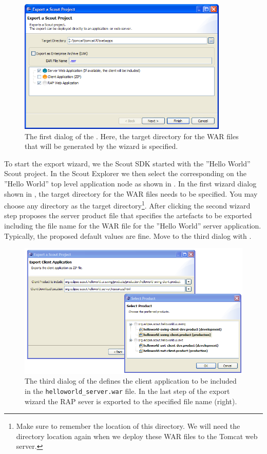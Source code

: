 \documentclass[a4paper,10pt,twoside]{book}
\begin{document}
\begin{figure}
\includegraphics[width=10cm]{export_wizard_1.png}
\caption{The first dialog of the . 
Here, the target directory for the WAR files that will be generated by the wizard is specified.}
\end{figure}

To start the export wizard, we the Scout SDK started with the ''Hello World'' Scout project.
In the Scout Explorer we then select the corresponding  on the ''Hello World'' top level application node as shown in .
In the first wizard dialog shown in , the target directory for the WAR files needs to be specified.
You may choose any directory as the target directory\footnote{
Make sure to remember the location of this directory.
We will need the directory location again when we deploy these WAR files to the Tomcat web server.
}.
After clicking  the second wizard step proposes the server product file that specifies the artefacts to be exported including the file name for the WAR file for the ''Hello World'' server application.
Typically, the proposed default values are fine.
Move to the third dialog with .

\begin{figure}
\includegraphics[width=13cm]{export_wizard_3.png}
\caption{The third dialog of the  defines the client application to be included in the \texttt{helloworld\_server.war} file.
In the last step of the export wizard the RAP sever is exported to the specified file name (right).}
\end{figure}
\end{document}
